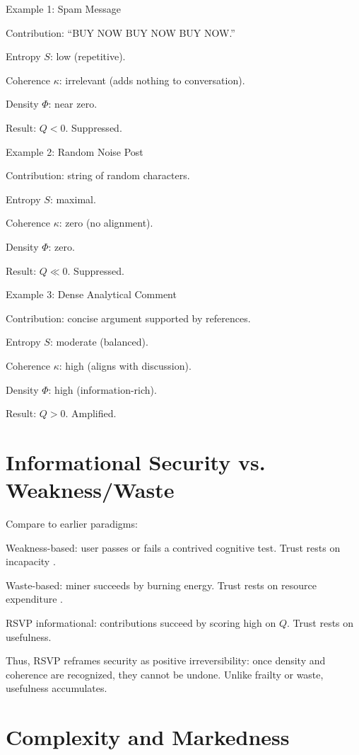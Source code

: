 \documentclass{book}
\begin{document}
Example 1: Spam Message

Contribution: ``BUY NOW BUY NOW BUY NOW.''

Entropy \( S \): low (repetitive).

Coherence \( \kappa \): irrelevant (adds nothing to conversation).

Density \( \Phi \): near zero.

Result: \( Q < 0 \). Suppressed.

Example 2: Random Noise Post

Contribution: string of random characters.

Entropy \( S \): maximal.

Coherence \( \kappa \): zero (no alignment).

Density \( \Phi \): zero.

Result: \( Q \ll 0 \). Suppressed.

Example 3: Dense Analytical Comment

Contribution: concise argument supported by references.

Entropy \( S \): moderate (balanced).

Coherence \( \kappa \): high (aligns with discussion).

Density \( \Phi \): high (information-rich).

Result: \( Q > 0 \). Amplified.

\section{Informational Security vs. Weakness/Waste}

Compare to earlier paradigms:

Weakness-based: user passes or fails a contrived cognitive test. Trust rests on incapacity \cite{conitzer2020}.

Waste-based: miner succeeds by burning energy. Trust rests on resource expenditure \cite{nakamoto2008}.

RSVP informational: contributions succeed by scoring high on \( Q \). Trust rests on usefulness.

Thus, RSVP reframes security as positive irreversibility: once density and coherence are recognized, they cannot be undone. Unlike frailty or waste, usefulness accumulates.

\section{Complexity and Markedness}
\end{document}
